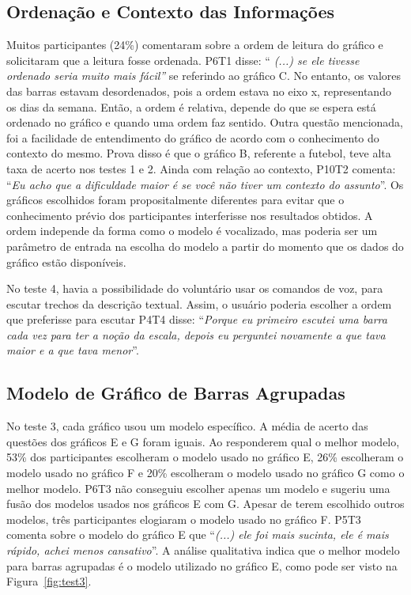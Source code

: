 \documentclass[
	12pt,				%
	openright,			%
	oneside,			%
	a4paper,			%
	english,			%
	brazil				%
	]{abntex2}
\begin{document}
\subsection{Ordenação e Contexto das Informações}

Muitos participantes (24\%) comentaram sobre a ordem de leitura do gráfico e solicitaram que a leitura fosse ordenada. P6T1 disse: ``\textit{ (...) se ele tivesse ordenado seria muito mais fácil''} se referindo ao gráfico C. No entanto, os valores das barras estavam desordenados, pois a ordem estava no eixo x, representando os dias da semana. Então, a ordem é relativa, depende do que se espera está ordenado no gráfico e quando uma ordem faz sentido. Outra questão mencionada, foi a facilidade de entendimento do gráfico de acordo com o conhecimento do contexto do mesmo. Prova disso é que o gráfico B, referente a futebol, teve alta taxa de acerto nos testes 1 e 2. Ainda com relação ao contexto, P10T2 comenta: ``\textit{Eu acho que a dificuldade maior é se você não tiver um contexto do assunto}''. Os gráficos escolhidos foram propositalmente diferentes para evitar que o conhecimento prévio dos participantes interferisse nos resultados obtidos. 
A ordem independe da forma como o modelo é vocalizado, mas poderia ser um parâmetro de entrada na escolha do modelo a partir do momento que os dados do gráfico estão disponíveis.

No teste 4, havia a possibilidade do voluntário usar os comandos de voz, para escutar trechos da descrição textual. Assim, o usuário poderia escolher a ordem que preferisse para escutar  P4T4 disse: ``\textit{Porque eu primeiro escutei uma barra cada vez para ter a noção da escala, depois eu perguntei novamente a que tava maior e a que tava menor}''.

\subsection{Modelo de Gráfico de Barras Agrupadas}

No teste 3, cada gráfico usou um modelo específico. A média de acerto das questões dos gráficos E e G foram iguais. Ao responderem qual o melhor modelo, 53\% dos participantes escolheram o modelo usado no gráfico E, 26\% escolheram o modelo usado no gráfico F e 20\% escolheram o modelo usado no gráfico G como o melhor modelo. P6T3 não conseguiu escolher apenas um modelo e sugeriu uma fusão dos modelos usados nos gráficos E com G. Apesar de terem escolhido outros modelos, três participantes elogiaram o modelo usado no gráfico F. P5T3 comenta sobre o modelo do gráfico E que ``\textit{(...) ele foi mais sucinta, ele é mais rápido, achei menos cansativo}''. A análise qualitativa indica que o melhor modelo para barras agrupadas é o modelo utilizado no gráfico E, como pode ser visto na Figura~\ref{fig:test3}.
\end{document}
